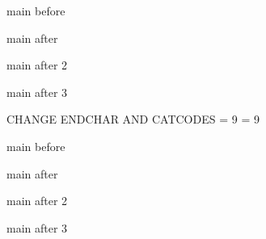 \documentclass{article}
\begin{document}
main before



main after



main after 2



main after 3

\par CHANGE ENDCHAR AND CATCODES
  = 9\relax
{}  = 9\relax

main before



main after



main after 2



main after 3
\end{document}
